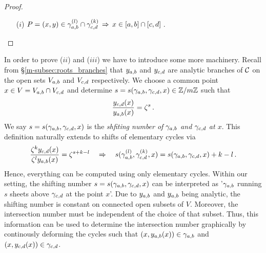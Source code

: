 \documentclass[main.tex]{subfiles}
\begin{document}
  \begin{proof}\let\qed\relax
   \begin{itemize}
    \item[($i$)] $P = (x,y) \in \gamma_{a,b}^{(l)} \cap \gamma_{c,d}^{(k)} \,  \Rightarrow \, x \in [a,b] \cap [c,d]$\,.
   \end{itemize}
  \end{proof}
  
  In order to prove ($ii$) and ($iii$) we have to introduce some more machinery. Recall from \S \ref{m-subsec:roots_branches} that $y_{a,b}$ and $y_{c,d}$ are analytic branches of $\mathcal{C}$ on the open sets
  $V_{a,b}$ and $V_{c,d}$ respectively. \abstandl
  We choose a common point $x \in V = V_{a,b} \cap V_{c,d}$ and determine $s  = s(\gamma_{a,b},\gamma_{c,d},x) \in \mathbb{Z}/m\mathbb{Z}$  such that
  \begin{align}
	  \frac{y_{c,d}(x)}{y_{a,b}(x)} = \zeta^s \,.
  \end{align}
  We say $s  = s(\gamma_{a,b},\gamma_{c,d},x)$ is the \emph{shfiting number of $\gamma_{a,b}$ and $\gamma_{c,d}$ at $x$}.
  This definition naturally extends to shifts of elementary cycles via
\begin{align}\label{eq:shift_numb_rel}
	 \frac{\zeta^ky_{c,d}(x)}{\zeta^ly_{a,b}(x)} = \zeta^{s+k-l} \quad \Rightarrow \quad s(\gamma_{a,b}^{(l)},\gamma_{c,d}^{(k)},x) = s(\gamma_{a,b},\gamma_{c,d},x) + k - l\,.
\end{align}
	Hence, everything can be computed using only elementary cycles. \abstandl
	Within our setting, the shifting number $s=s(\gamma_{a,b},\gamma_{c,d},x)$  can be interpreted as '$\gamma_{a,b}$ running $s$ sheets above $\gamma_{c,d}$ at the point $x$'. 
	Due to $y_{a,b}$ and $y_{a,b}$ being analytic, the shifting number is constant on connected open subsets of $V$. Moreover, the intersection number must be independent of the choice of that subset. \abstandl
	Thus,
	this information can be used to determine
	the intersection number graphically by continously deforming the cycles such that $(x,y_{a,b}(x)) \in \gamma_{a,b}$ and $(x,y_{c,d}(x)) \in \gamma_{c,d}$.
	
\end{document}
